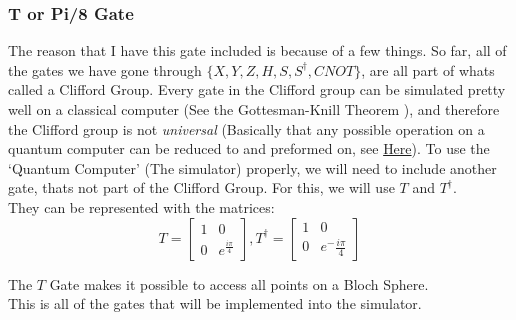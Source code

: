 \documentclass[../main.tex]{subfiles}
\begin{document}
\subsubsection{T or Pi/8 Gate}

The reason that I have this gate included is because of a few things. So
far, all of the gates we have gone through
\(\{ X,Y,Z,H,S,S^\dagger, CNOT \}\), are all part of whats called a
Clifford Group. Every gate in the Clifford group can be simulated pretty
well on a classical computer (See the Gottesman-Knill Theorem \cite{gottesmanknill}),
and therefore the Clifford group is not \emph{universal} (Basically that
any possible operation on a quantum computer can be reduced to and
preformed on, see
\href{https://en.wikipedia.org/wiki/Quantum_gate\#Universal_quantum_gates}{Here}).
To use the `Quantum Computer' (The simulator) properly, we will need to
include another gate, thats not part of the Clifford Group. For this, we
will use \(T\) and \(T^\dagger\).\\
They can be represented with the matrices:\\
\begin{equation}
	T = \left[ \begin{matrix} 1 & 0\\0 & e^\frac{i\pi}{4}\end{matrix} \right], T^\dagger = \left[ \begin{matrix} 1 & 0\\0 & e^-\frac{i\pi}{4}\end{matrix} \right]
\end{equation}

The \(T\) Gate makes it possible to access all points on a Bloch
Sphere.\\
This is all of the gates that will be implemented into the simulator.
\end{document}
